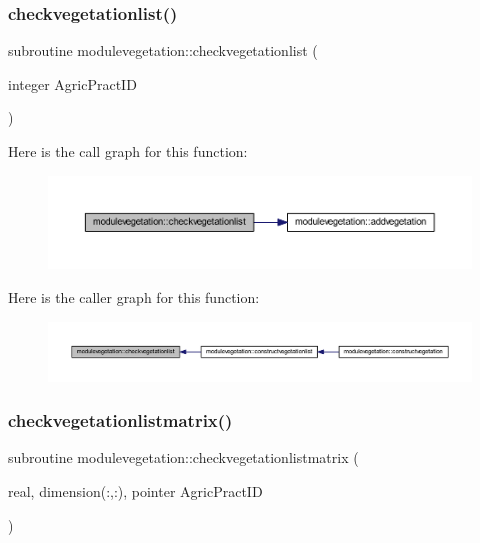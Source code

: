 \subsubsection{\texorpdfstring{checkvegetationlist()}{checkvegetationlist()}}
{\footnotesize\ttfamily subroutine modulevegetation\+::checkvegetationlist (\begin{DoxyParamCaption}\item[{integer}]{Agric\+Pract\+ID }\end{DoxyParamCaption})\hspace{0.3cm}{\ttfamily [private]}}

Here is the call graph for this function\+:\nopagebreak
\begin{figure}[H]
\begin{center}
\leavevmode
\includegraphics[width=350pt]{namespacemodulevegetation_a5a2c8672adf25c28f58c08cd7f76e1c6_cgraph}
\end{center}
\end{figure}
Here is the caller graph for this function\+:\nopagebreak
\begin{figure}[H]
\begin{center}
\leavevmode
\includegraphics[width=350pt]{namespacemodulevegetation_a5a2c8672adf25c28f58c08cd7f76e1c6_icgraph}
\end{center}
\end{figure}
\mbox{\label{namespacemodulevegetation_a487744668471d5e49ad9df7d7686866e}} 
\subsubsection{\texorpdfstring{checkvegetationlistmatrix()}{checkvegetationlistmatrix()}}
{\footnotesize\ttfamily subroutine modulevegetation\+::checkvegetationlistmatrix (\begin{DoxyParamCaption}\item[{real, dimension(\+:,\+:), pointer}]{Agric\+Pract\+ID }\end{DoxyParamCaption})\hspace{0.3cm}{\ttfamily [private]}}

